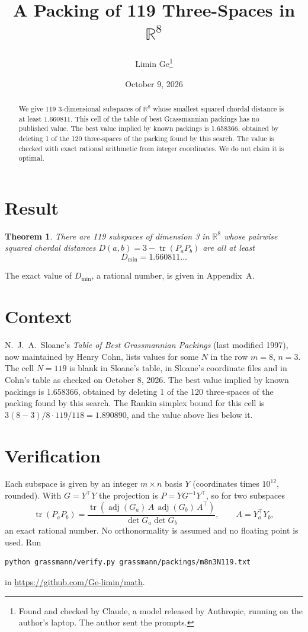 \documentclass[11pt,a4paper]{article}
\title{A Packing of 119 Three-Spaces in $\mathbb{R}^{8}$}
\author{Limin Ge\thanks{Found and checked by Claude, a model released by Anthropic, running on the author's laptop. The author sent the prompts.}}
\date{October 9, 2026}
\newtheorem*{theorem}{Theorem}
\begin{document}
\maketitle
\begin{abstract}
We give 119 3-dimensional subspaces of $\mathbb{R}^{8}$ whose smallest squared chordal distance is at least 1.660811. This cell of the table of best Grassmannian packings has no published value. The best value implied by known packings is 1.658366, obtained by deleting 1 of the 120 three-spaces of the packing found by this search. The value is checked with exact rational arithmetic from integer coordinates. We do not claim it is optimal.
\end{abstract}

\section{Result}
\begin{theorem}
There are 119 subspaces of dimension 3 in $\mathbb{R}^{8}$ whose pairwise squared chordal distances $D(a,b) = 3 - \operatorname{tr}(P_aP_b)$ are all at least
\[ D_{\min} = 1.660811\ldots \]
\end{theorem}
The exact value of $D_{\min}$, a rational number, is given in Appendix~A.


\section{Context}
N.~J.~A.~Sloane's \emph{Table of Best Grassmannian Packings} (last modified 1997), now maintained by Henry Cohn, lists values for some $N$ in the row $m=8$, $n=3$. The cell $N=119$ is blank in Sloane's table, in Sloane's coordinate files and in Cohn's table as checked on October 8, 2026. The best value implied by known packings is 1.658366, obtained by deleting 1 of the 120 three-spaces of the packing found by this search. The Rankin simplex bound for this cell is $3(8-3)/8\cdot 119/118 = 1.890890$, and the value above lies below it.


\section{Verification}
Each subspace is given by an integer $m\times n$ basis $Y$ (coordinates times $10^{12}$, rounded). With $G=Y^\top Y$ the projection is $P=YG^{-1}Y^\top$, so for two subspaces
\[ \operatorname{tr}(P_aP_b)=\frac{\operatorname{tr}(\operatorname{adj}(G_a)\,A\,\operatorname{adj}(G_b)\,A^\top)}{\det G_a\det G_b},\qquad A=Y_a^\top Y_b, \]
an exact rational number. No orthonormality is assumed and no floating point is used. Run
\begin{verbatim}
python grassmann/verify.py grassmann/packings/m8n3N119.txt
\end{verbatim}
in \url{https://github.com/Ge-limin/math}.
\end{document}
